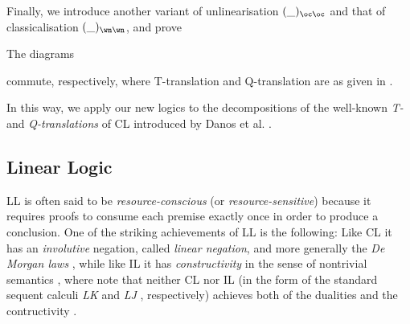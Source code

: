 \documentclass[a4paper]{article}
\theoremstyle{definition}
\theoremstyle{theorem}
\theoremstyle{remark}
\begin{document}
Finally, we introduce another variant of unlinearisation $(\_)_{\oc\oc}$ and that of classicalisation $(\_)_{\wn\wn}$, and prove
\begin{proposition*}
The diagrams
\begin{mathpar}
\end{mathpar}
commute, respectively, where T-translation and Q-translation are as given in \cite{danos1995lkq}.
\end{proposition*}

In this way, we apply our new logics to the decompositions of the well-known \emph{T-} and \emph{Q-translations} of CL introduced by Danos et al. \cite{danos1995lkq}.
\fi




\subsection{Linear Logic}
LL is often said to be \emph{resource-conscious} (or \emph{resource-sensitive}) because it requires proofs to consume each premise exactly once in order to produce a conclusion. %
One of the striking achievements of LL is the following: Like CL it has an \emph{involutive} negation, called \emph{linear negation}, and more generally the \emph{De Morgan laws} \cite{girard1987linear,girard1995linear}, while like IL it has \emph{constructivity} in the sense of nontrivial semantics \cite{girard1989proofs}, where note that neither CL nor IL (in the form of the standard sequent calculi \emph{\textsf{LK}} and \emph{\textsf{LJ}} \cite{gentzen1935untersuchungen,troelstra2000basic}, respectively) achieves both of the dualities and the contructivity \cite{girard1989proofs,troelstra2000basic}.
\end{document}
